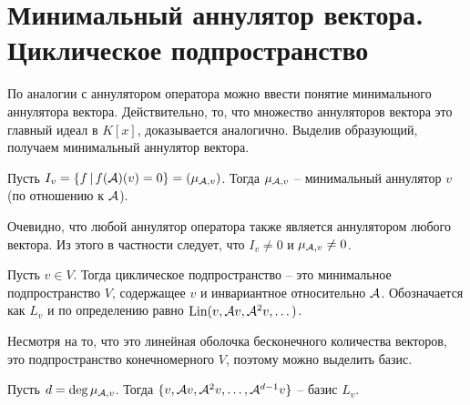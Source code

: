 \section{Минимальный аннулятор вектора. Циклическое подпространство}

По аналогии с аннулятором оператора можно ввести понятие минимального аннулятора вектора.
Действительно, то, что множество аннуляторов вектора это главный идеал в $K[x]$, доказывается аналогично.
Выделив образующий, получаем минимальный аннулятор вектора.

\begin{conj}
    Пусть $I_v = \{ f \, | \, f(\mathcal{A}) (v) = 0 \} = (\mu_{\mathcal{A}, v})$.
    Тогда $\mu_{\mathcal{A}, v}$ -- минимальный аннулятор $v$ (по отношению к $\mathcal{A}$).
\end{conj}

Очевидно, что любой аннулятор оператора также является аннулятором любого вектора.
Из этого в частности следует, что $I_v \neq 0$ и $\mu_{\mathcal{A}, v} \neq 0$. 

\vspace*{5mm}

\begin{conj}
    Пусть $v \in V$.
    Тогда циклическое подпространство -- это минимальное подпространство $V$, содержащее $v$ и инвариантное относительно $\mathcal{A}$.
    Обозначается как $L_v$ и по определению равно $\operatorname{Lin} (v, \mathcal{A} v, \mathcal{A}^2 v, \dots)$.
\end{conj}

\vspace*{3mm}

Несмотря на то, что это линейная оболочка бесконечного количества векторов, это подпространство конечномерного $V$, поэтому можно выделить базис.

\vspace*{2mm}

\begin{theorem}
    Пусть $d = \deg \mu_{\mathcal{A}, v}$.
    Тогда $\{ v, \mathcal{A} v, \mathcal{A}^2 v, \dots, \mathcal{A}^{d - 1} v \}$ -- базис $L_v$.
\end{theorem}

